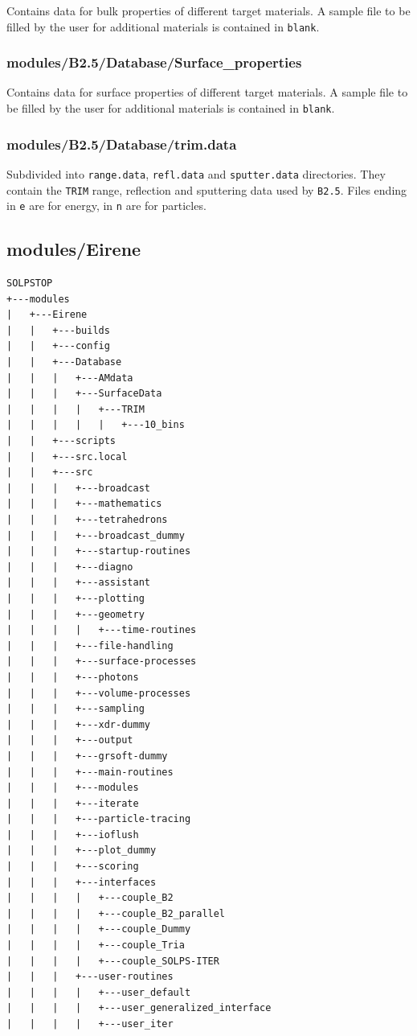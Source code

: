 \documentclass[a4paper,10pt]{report}
\begin{document}
Contains data for bulk properties of different target materials.
A sample file to be filled by the user for additional materials
is contained in {\tt blank}.

\subsubsection{modules/B2.5/Database/Surface\_properties}

Contains data for surface properties of different target materials.
A sample file to be filled by the user for additional materials
is contained in {\tt blank}.

\subsubsection{modules/B2.5/Database/trim.data}

Subdivided into {\tt range.data}, {\tt refl.data} and {\tt sputter.data}
directories. They contain the {\tt TRIM} range, reflection and sputtering
data used by {\tt B2.5}. Files ending in {\tt e} are for energy, in
{\tt n} are for particles.

\newpage
\subsection{modules/Eirene}
\label{cha:eirene}


\begin{verbatim}
SOLPSTOP
+---modules
|   +---Eirene
|   |   +---builds
|   |   +---config
|   |   +---Database
|   |   |   +---AMdata
|   |   |   +---SurfaceData
|   |   |   |   +---TRIM
|   |   |   |   |   +---10_bins
|   |   +---scripts
|   |   +---src.local
|   |   +---src
|   |   |   +---broadcast
|   |   |   +---mathematics
|   |   |   +---tetrahedrons
|   |   |   +---broadcast_dummy
|   |   |   +---startup-routines
|   |   |   +---diagno
|   |   |   +---assistant
|   |   |   +---plotting
|   |   |   +---geometry
|   |   |   |   +---time-routines
|   |   |   +---file-handling
|   |   |   +---surface-processes
|   |   |   +---photons
|   |   |   +---volume-processes
|   |   |   +---sampling
|   |   |   +---xdr-dummy
|   |   |   +---output
|   |   |   +---grsoft-dummy
|   |   |   +---main-routines
|   |   |   +---modules
|   |   |   +---iterate
|   |   |   +---particle-tracing
|   |   |   +---ioflush
|   |   |   +---plot_dummy
|   |   |   +---scoring
|   |   |   +---interfaces
|   |   |   |   +---couple_B2
|   |   |   |   +---couple_B2_parallel
|   |   |   |   +---couple_Dummy
|   |   |   |   +---couple_Tria
|   |   |   |   +---couple_SOLPS-ITER
|   |   |   +---user-routines
|   |   |   |   +---user_default
|   |   |   |   +---user_generalized_interface
|   |   |   |   +---user_iter
\end{verbatim}
\end{document}
